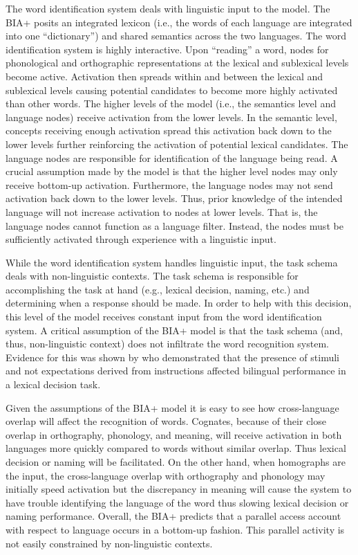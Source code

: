 
The word identification system deals with linguistic input to the model. The BIA+ posits an integrated lexicon (i.e., the words of each language are integrated into one ``dictionary'') and shared semantics across the two languages. The word identification system is highly interactive. Upon ``reading'' a word, nodes for phonological and orthographic representations at the lexical and sublexical levels become active. Activation then spreads within and between the lexical and sublexical levels causing potential candidates to become more highly activated than other words. The higher levels of the model (i.e., the semantics level and language nodes) receive activation from the lower levels. In the semantic level, concepts receiving enough activation spread this activation back down to the lower levels further reinforcing the activation of potential lexical candidates. The language nodes are responsible for identification of the language being read. A crucial assumption made by the model is that the higher level nodes may only receive bottom-up activation. Furthermore, the language nodes may not send activation back down to the lower levels. Thus, prior knowledge of the intended language will not increase activation to nodes at lower levels. That is, the language nodes cannot function as a language filter. Instead, the nodes must be sufficiently activated through experience with a linguistic input.

While the word identification system handles linguistic input, the task schema deals with non-linguistic contexts. The task schema is responsible for accomplishing the task at hand (e.g., lexical decision, naming, etc.) and determining when a response should be made. In order to help with this decision, this level of the model receives constant input from the word identification system. A critical assumption of the BIA+ model is that the task schema (and, thus, non-linguistic context) does not infiltrate the word recognition system. Evidence for this was shown by  \citet{Dijkstra2000} who demonstrated that the presence of stimuli and not expectations derived from instructions affected bilingual performance in a lexical decision task.

Given the assumptions of the BIA+ model it is easy to see how cross-language overlap will affect the recognition of words. Cognates, because of their close overlap in orthography, phonology, and meaning, will receive activation in both languages more quickly compared to words without similar overlap. Thus lexical decision or naming will be facilitated. On the other hand, when homographs are the input, the cross-language overlap with orthography and phonology may initially speed activation but the discrepancy in meaning will cause the system to have trouble identifying the language of the word thus slowing lexical decision or naming performance. Overall, the BIA+ predicts that a parallel access account with respect to language occurs in a bottom-up fashion. This parallel activity is not easily constrained by non-linguistic contexts. 

